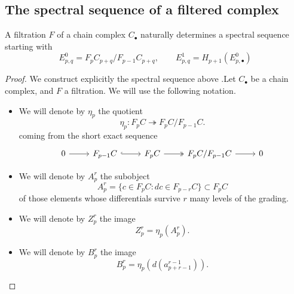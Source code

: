 \documentclass[main.tex]{subfiles}
\begin{document}
\subsection{The spectral sequence of a filtered complex}
\label{ssc:the_spectral_sequence_of_a_filtered_complex}

\begin{theorem}
  A filtration $F$ of a chain complex $C_{\bullet}$ naturally determines a spectral sequence starting with
  \begin{equation*}
    E^{0}_{p,q} = F_{p}C_{p+q}/F_{p-1}C_{p+q},\qquad E^{1}_{p,q} = H_{p+1}(E^{0}_{p,
    \bullet})
  \end{equation*}
\end{theorem}
\begin{proof}
  We construct explicitly the spectral sequence above .Let $C_{\bullet}$ be a chain complex, and $F$ a filtration. We will use the following notation.
  \begin{itemize}
    \item We will denote by $\eta_{p}$ the quotient
      \begin{equation*}
        \eta_{p}\colon F_{p}C \twoheadrightarrow F_{p}C/F_{p-1}C.
      \end{equation*}
      coming from the short exact sequence
      \begin{equation*}
        \begin{tikzcd}
          0
          \arrow[r]
          & F_{p-1}C
          \arrow[r, hook]
          & F_{p}C
          \arrow[r, two heads]
          & F_{p}C/F_{p-1}C
          \arrow[r]
          & 0
        \end{tikzcd}
      \end{equation*}

    \item We will denote by $A^{r}_{p}$ the subobject
      \begin{equation*}
        A^{r}_{p} = \{c \in F_{p}C\colon dc \in F_{p-r}C\} \subset F_{p}C
      \end{equation*}
      of those elements whose differentials survive $r$ many levels of the grading.

    \item We will denote by $Z^{r}_{p}$ the image
      \begin{equation*}
        Z^{r}_{p} = \eta_{p}(A^{r}_{p}).
      \end{equation*}

    \item We will denote by $B^{r}_{p}$ the image
      \begin{equation*}
        B^{r}_{p} = \eta_{p}(d(a^{r-1}_{p+r-1})).
      \end{equation*}
  \end{itemize}


\end{proof}
\end{document}
